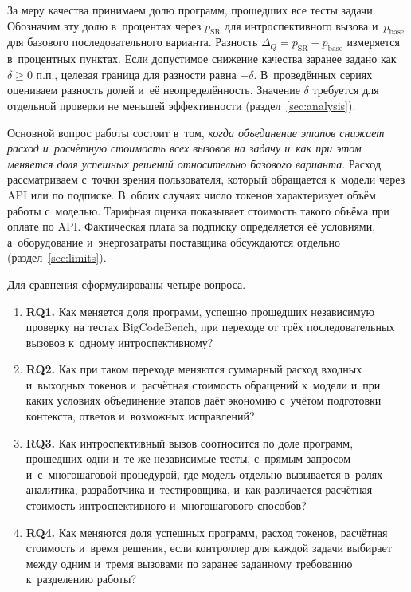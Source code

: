 За меру качества принимаем долю программ, прошедших все тесты задачи. Обозначим эту долю в~процентах через $p_{\mathrm{SR}}$ для интроспективного вызова и~$p_{\mathrm{base}}$ для базового последовательного варианта. Разность $\Delta_Q=p_{\mathrm{SR}}-p_{\mathrm{base}}$ измеряется в~процентных пунктах. Если допустимое снижение качества заранее задано как $\delta\geq 0$ п.п., целевая граница для разности равна $-\delta$. В~проведённых сериях оцениваем разность долей и~её неопределённость. Значение $\delta$ требуется для отдельной проверки не меньшей эффективности (раздел~\ref{sec:analysis}).

Основной вопрос работы состоит в~том, \emph{когда объединение этапов снижает расход и~расчётную стоимость всех вызовов на задачу и~как при этом меняется доля успешных решений относительно базового варианта}. Расход рассматриваем с~точки зрения пользователя, который обращается к~модели через API или по подписке. В~обоих случаях число токенов характеризует объём работы с~моделью. Тарифная оценка показывает стоимость такого объёма при оплате по API. Фактическая плата за подписку определяется её условиями, а~оборудование и~энергозатраты поставщика обсуждаются отдельно (раздел~\ref{sec:limits}).

Для сравнения сформулированы четыре вопроса.
\begin{enumerate}
\item \textbf{RQ1.} Как меняется доля программ, успешно прошедших независимую проверку на тестах BigCodeBench, при переходе от трёх последовательных вызовов к~одному интроспективному?
\item \textbf{RQ2.} Как при таком переходе меняются суммарный расход входных и~выходных токенов и~расчётная стоимость обращений к~модели и~при каких условиях объединение этапов даёт экономию с~учётом подготовки контекста, ответов и~возможных исправлений?
\item \textbf{RQ3.} Как интроспективный вызов соотносится по доле программ, прошедших одни и~те же независимые тесты, с~прямым запросом и~с~многошаговой процедурой, где модель отдельно вызывается в~ролях аналитика, разработчика и~тестировщика, и~как различается расчётная стоимость интроспективного и~многошагового способов?
\item \textbf{RQ4.} Как меняются доля успешных программ, расход токенов, расчётная стоимость и~время решения, если контроллер для каждой задачи выбирает между одним и~тремя вызовами по заранее заданному требованию к~разделению работы?
\end{enumerate}

